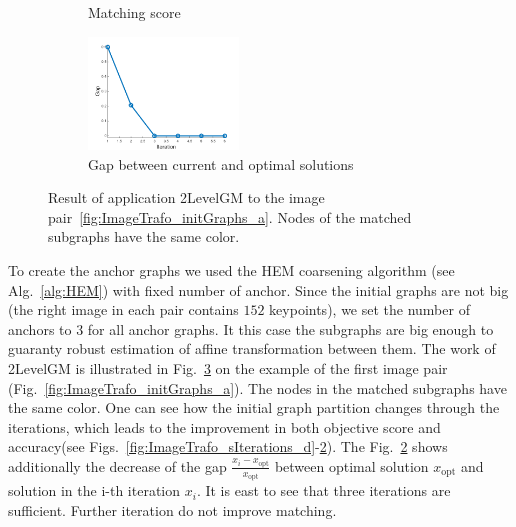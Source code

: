 \begin{figure}
\begin{subfigure}[b]{0.33\textwidth}
			\caption{Matching score}
			\label{fig:ImageTrafo_sIterations_e}
		\end{subfigure}
		\begin{subfigure}[b]{0.3\textwidth}
			\centering
			\includegraphics[width=4cm]{"chapter3/fig/ImageTrafo/sIterations/gap"}
			\caption{Gap between current and optimal solutions}
			\label{fig:ImageTrafo_sIterations_f}
		\end{subfigure} 	
	\caption[Result of application 2LevelGM to the image pair~\ref{fig:ImageTrafo_initGraphs_a}]{Result of application 2LevelGM to the image pair~\ref{fig:ImageTrafo_initGraphs_a}. Nodes of the matched subgraphs have the same color.}
	\label{fig:ImageTrafo_sIterations}
\end{figure}

To create the anchor graphs we used the HEM coarsening algorithm (see Alg.~\ref{alg:HEM}) with fixed number of anchor. Since the initial graphs are not big (the right image in each pair contains $152$ keypoints), we set the number of anchors to $3$ for all anchor graphs. It this case the subgraphs are big enough to guaranty robust estimation of affine transformation between them. The work of 2LevelGM is illustrated in Fig.~\ref{fig:ImageTrafo_sIterations} on the example of the first image pair (Fig.~\ref{fig:ImageTrafo_initGraphs_a}). The nodes in the matched subgraphs have the same color. One can see how the initial graph partition changes through the iterations, which leads to the improvement in both objective score and accuracy(see Figs.~\ref{fig:ImageTrafo_sIterations_d}-\ref{fig:ImageTrafo_sIterations_f}). The Fig.~\ref{fig:ImageTrafo_sIterations_f} shows additionally the decrease of the gap $\frac{x_i-x_{\text{opt}}}{x_{\text{opt}}}$ between optimal solution $x_{\text{opt}}$ and solution in the i-th iteration $x_i$. It is east to see that three iterations are sufficient. Further iteration do not improve matching.

